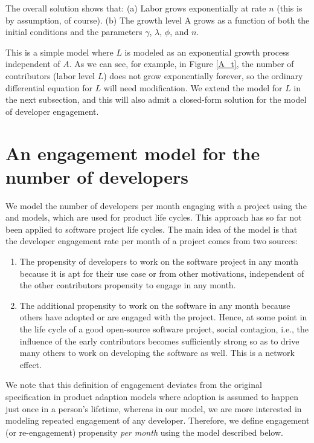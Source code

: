 \documentclass[conference]{IEEEtran}
\begin{document}
The overall solution shows that: (a) Labor grows exponentially at rate $n$ (this is by assumption, of course). (b) The growth level A grows as a function of both the initial conditions and the parameters $\gamma$, $\lambda$, $\phi$, and $n$.

This is a simple model where $L$ is modeled as an exponential growth process independent of $A$. As we can see, for example, in Figure \ref{A_t}, the number of contributors (labor level $L$) does not grow exponentially forever, so the ordinary differential equation for $L$ will need modification. We extend the model for $L$ in the next subsection, and this will also admit a closed-form solution for the model of developer engagement.  

\section{An engagement model for the number of developers}
\label{sec:dev_engagement}

We model the number of developers per month engaging with a project  using the \cite{bass_new_1969} and \cite{bass_why_1994} models, which are used for product life cycles. This approach has so far not been applied to software project life cycles. The main idea of the model is that the developer engagement rate per month of a project comes from two sources: 
\begin{enumerate}
\item The propensity of developers to work on the software project in any month because it is apt for their use case or from other motivations, independent of the other contributors propensity to engage in any month.
\item The additional propensity to work on the software in any month because others have adopted or are engaged with the project. Hence, at some point in the life cycle of a good open-source software project, social contagion, i.e., the influence of the early contributors becomes sufficiently strong so as to drive many others to work on developing the software as well. This is a network effect.
\end{enumerate}

We note that this definition of engagement deviates from the original specification in product adaption models where adoption is assumed to happen just once in a person's lifetime, whereas in our model, we are more interested in modeling repeated engagement of any developer. Therefore, we define engagement (or re-engagement) propensity {\em per month} using the model described below. 
\end{document}
